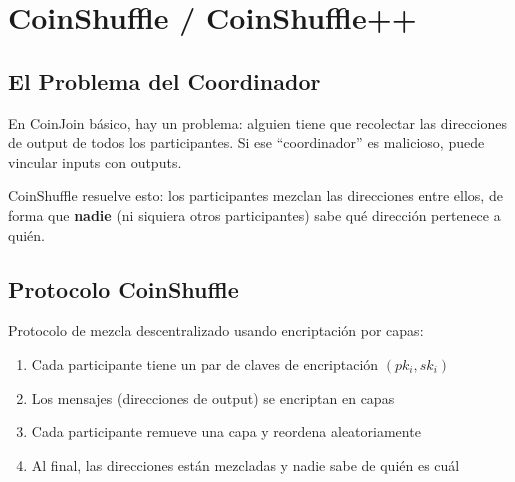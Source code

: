\documentclass[11pt,a4paper,twoside]{book}
\begin{document}
\section{CoinShuffle / CoinShuffle++}
\label{sec:coinshuffle}

\subsection{El Problema del Coordinador}

\begin{intuicion}
En CoinJoin b\'asico, hay un problema: alguien tiene que recolectar las direcciones de output de todos los participantes. Si ese ``coordinador'' es malicioso, puede vincular inputs con outputs.

CoinShuffle resuelve esto: los participantes mezclan las direcciones entre ellos, de forma que \textbf{nadie} (ni siquiera otros participantes) sabe qu\'e direcci\'on pertenece a qui\'en.
\end{intuicion}

\subsection{Protocolo CoinShuffle}

\begin{definition}[CoinShuffle]
Protocolo de mezcla descentralizado usando encriptaci\'on por capas:
\begin{enumerate}
    \item Cada participante tiene un par de claves de encriptaci\'on $(pk_i, sk_i)$
    \item Los mensajes (direcciones de output) se encriptan en capas
    \item Cada participante remueve una capa y reordena aleatoriamente
    \item Al final, las direcciones est\'an mezcladas y nadie sabe de qui\'en es cu\'al
\end{enumerate}
\end{definition}
\end{document}

